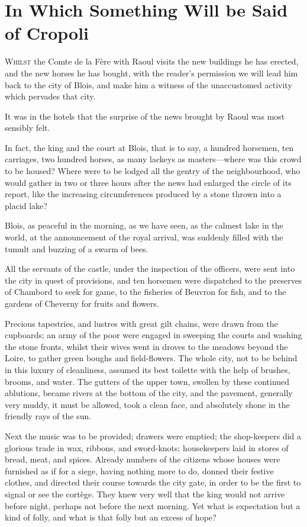 \chapter{In Which Something Will be Said of Cropoli}

\lettrine{W}{hilst} the Comte de la Fère with Raoul visits the new buildings he has erected, and the new horses he has bought, with the reader's permission we will lead him back to the city of Blois, and make him a witness of the unaccustomed activity which pervades that city.

It was in the hotels that the surprise of the news brought by Raoul was most sensibly felt.

In fact, the king and the court at Blois, that is to say, a hundred horsemen, ten carriages, two hundred horses, as many lackeys as masters—where was this crowd to be housed? Where were to be lodged all the gentry of the neighbourhood, who would gather in two or three hours after the news had enlarged the circle of its report, like the increasing circumferences produced by a stone thrown into a placid lake?

Blois, as peaceful in the morning, as we have seen, as the calmest lake in the world, at the announcement of the royal arrival, was suddenly filled with the tumult and buzzing of a swarm of bees.

All the servants of the castle, under the inspection of the officers, were sent into the city in quest of provisions, and ten horsemen were dispatched to the preserves of Chambord to seek for game, to the fisheries of Beuvron for fish, and to the gardens of Cheverny for fruits and flowers.

Precious tapestries, and lustres with great gilt chains, were drawn from the cupboards; an army of the poor were engaged in sweeping the courts and washing the stone fronts, whilst their wives went in droves to the meadows beyond the Loire, to gather green boughs and field-flowers. The whole city, not to be behind in this luxury of cleanliness, assumed its best toilette with the help of brushes, brooms, and water. The gutters of the upper town, swollen by these continued ablutions, became rivers at the bottom of the city, and the pavement, generally very muddy, it must be allowed, took a clean face, and absolutely shone in the friendly rays of the sun.

Next the music was to be provided; drawers were emptied; the shop-keepers did a glorious trade in wax, ribbons, and sword-knots; housekeepers laid in stores of bread, meat, and spices. Already numbers of the citizens whose houses were furnished as if for a siege, having nothing more to do, donned their festive clothes, and directed their course towards the city gate, in order to be the first to signal or see the cortège. They knew very well that the king would not arrive before night, perhaps not before the next morning. Yet what is expectation but a kind of folly, and what is that folly but an excess of hope?

